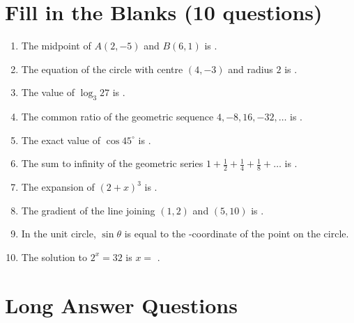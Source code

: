 \documentclass{../Templates/sbs-exam}
\begin{document}
\section*{Fill in the Blanks (10 questions)}
\begin{enumerate}
    \item The midpoint of $A(2,-5)$ and $B(6,1)$ is \underline{\hspace{2cm}}.
    
    \item The equation of the circle with centre $(4,-3)$ and radius $2$ is \underline{\hspace{2cm}}.
    
    \item The value of $\log_3 27$ is \underline{\hspace{2cm}}.
    
    \item The common ratio of the geometric sequence $4, -8, 16, -32, \dots$ is \underline{\hspace{2cm}}.
    
    \item The exact value of $\cos 45^\circ$ is \underline{\hspace{2cm}}.
    
    \item The sum to infinity of the geometric series $1 + \frac{1}{2} + \frac{1}{4} + \frac{1}{8} + \dots$ is \underline{\hspace{2cm}}.
    
    \item The expansion of $(2+x)^3$ is \underline{\hspace{2cm}}.
    
    \item The gradient of the line joining $(1,2)$ and $(5,10)$ is \underline{\hspace{2cm}}.
    
    \item In the unit circle, $\sin\theta$ is equal to the \underline{\hspace{2cm}}-coordinate of the point on the circle.
    
    \item The solution to $2^{x} = 32$ is $x =$ \underline{\hspace{2cm}}.
\end{enumerate}

\newpage

\section*{Long Answer Questions}
\end{document}
